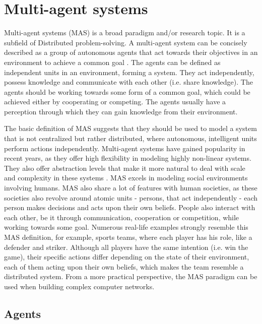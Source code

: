 \documentclass[0main.tex]{subfiles}
\begin{document}
\section{Multi-agent systems} \label{sec-mas}

Multi-agent systems (MAS) is a broad paradigm and/or research topic. It is a subfield of Distributed
problem-solving. A multi-agent system can be concisely described as a group
of autonomous agents that act towards their objectives in an environment to achieve a common goal
\cite{ParasumannaGokulan2010}. The agents can be defined as independent units in
an environment, forming a system. They act independently, possess
knowledge and communicate with each other (i.e. share knowledge). The agents
should be working towards some form of a common goal, which could be achieved
either by cooperating or competing. The agents usually have a perception
through which they can gain knowledge from their environment.

The basic definition of MAS suggests that they should be used to model
a system that is not centralized but rather distributed, where autonomous, intelligent units perform
actions independently. Multi-agent systems have gained popularity in recent years, as they
offer high flexibility in modeling highly non-linear systems. They also offer abstraction levels that
make it more natural to deal with scale and complexity in these systems
\cite{Burmeister1997ApplicationOM}. MAS excels in modeling social environments
involving humans. MAS also share a lot of features with human societies, as these societies also revolve
around atomic units - persons, that act independently - each person makes decisions and acts upon
their own beliefs. People also interact with each other, be it through communication, cooperation or
competition, while working towards some goal. Numerous real-life examples strongly
resemble this MAS definition, for example, sports teams, where each player has his role, like
a defender and striker. Although all players have the same intention (i.e. win the game), their
specific actions differ depending on the state of their environment, each of them acting upon their
own beliefs, which makes the team resemble a distributed system. From a more practical perspective,
the MAS paradigm can be used when building complex computer networks.

\subsection{Agents}
\end{document}
